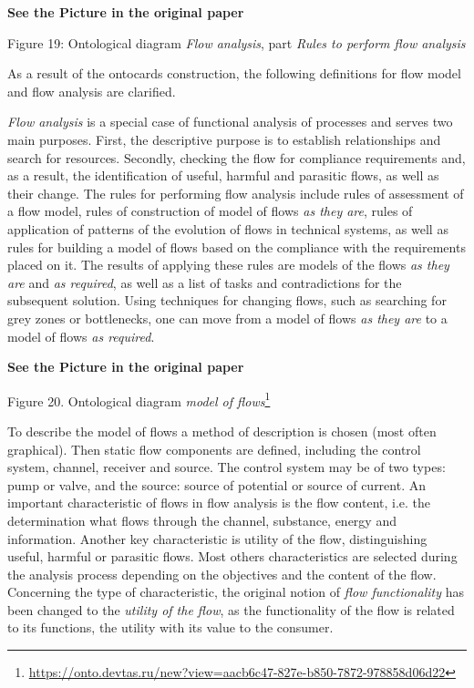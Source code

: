 \documentclass[11pt,a4paper]{article}
\newcommand{\addpicture}{\textbf{See the Picture in the original paper}\par}
\begin{document}
\begin{center}
  \addpicture
  Figure 19: Ontological diagram \emph{Flow analysis}, part \emph{Rules
  to perform flow analysis}
\end{center}
As a result of the ontocards construction, the following definitions for flow
model and flow analysis are clarified.

\emph{Flow analysis} is a special case of functional analysis of processes and
serves two main purposes. First, the descriptive purpose is to establish
relationships and search for resources. Secondly, checking the flow for
compliance requirements and, as a result, the identification of useful,
harmful and parasitic flows, as well as their change. The rules for performing
flow analysis include rules of assessment of a flow model, rules of
construction of model of flows \emph{as they are}, rules of application of
patterns of the evolution of flows in technical systems, as well as rules for
building a model of flows based on the compliance with the requirements placed
on it. The results of applying these rules are models of the flows \emph{as
  they are} and \emph{as required}, as well as a list of tasks and
contradictions for the subsequent solution. Using techniques for changing
flows, such as searching for grey zones or bottlenecks, one can move from
a model of flows \emph{as they are} to a model of flows \emph{as required}.
\begin{center}
  \addpicture
  Figure 20. Ontological diagram \emph{model of 
  flows}\footnote{\url{https://onto.devtas.ru/new?view=aacb6c47-827e-b850-7872-978858d06d22}} 
\end{center}
To describe the model of flows a method of description is chosen (most often
graphical).  Then static flow components are defined, including the control
system, channel, receiver and source. The control system may be of two types:
pump or valve, and the source: source of potential or source of current.  An
important characteristic of flows in flow analysis is the flow content, i.e.
the determination what flows through the channel, substance, energy and
information.  Another key characteristic is utility of the flow,
distinguishing useful, harmful or parasitic flows. Most others characteristics
are selected during the analysis process depending on the objectives and the
content of the flow. Concerning the type of characteristic, the original
notion of \emph{flow functionality} has been changed to the \emph{utility of
  the flow}, as the functionality of the flow is related to its functions, the
utility with its value to the consumer.
\end{document}
